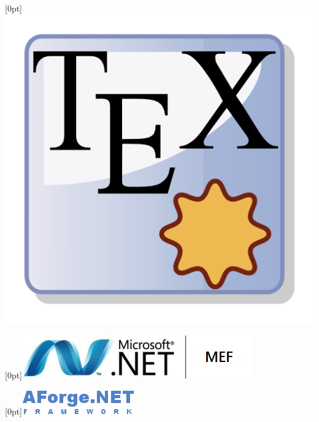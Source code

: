 \documentclass[t]{beamer}
\begin{document}
\begin{frame}
	\begin{minipage}{5,5cm}
	\centering
	\raisebox{-1.5cm}[0pt]{\includegraphics[scale=1]{img/logos/texmaker-logo.png}}
	\end{minipage}
	\begin{minipage}{5,5cm}
	\centering
	\raisebox{-1.5cm}[0pt]{\includegraphics[scale=.5]{img/logos/MEF-logo.jpg}}
	\end{minipage}
	\begin{minipage}{5,5cm}
	\centering
	\raisebox{-1.5cm}[0pt]{\includegraphics[scale=.5]{img/libsFrameworks/aforgenetf.jpg}}
	\end{minipage}
\end{frame}
\end{document}
